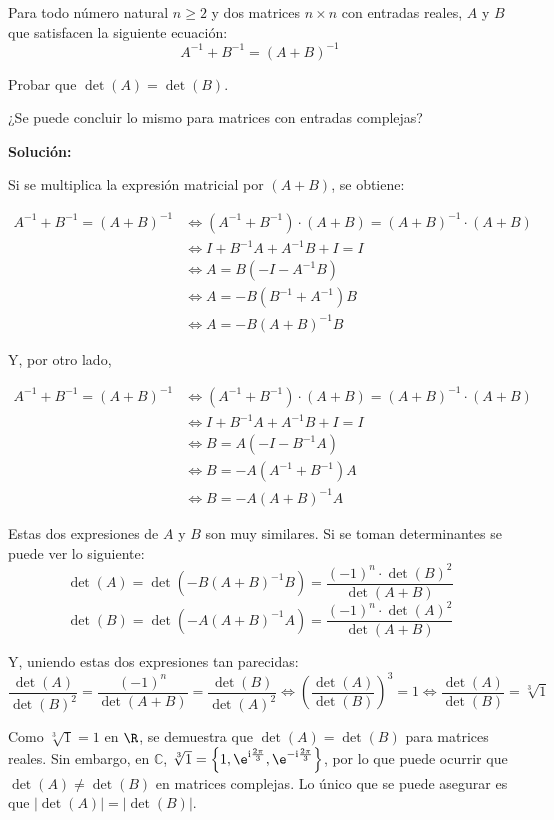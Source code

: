 \documentclass[../../main.tex]{subfiles}
\begin{document}
  \begin{shaded}
    Para todo número natural $n \geq 2$ y dos matrices $n \times n$ con entradas reales, $A$ y $B$ que satisfacen la siguiente ecuación:
    $$
    A^{-1} + B^{-1} = (A + B)^{-1}
    $$

    Probar que $\det{(A)} = \det{(B)}$.

    ¿Se puede concluir lo mismo para matrices con entradas complejas?
  \end{shaded}

  \textbf{Solución:}

  Si se multiplica la expresión matricial por $(A + B)$, se obtiene:

  \begin{equation*}
    \begin{split}
      A^{-1} + B^{-1} = (A + B)^{-1} & \iff
      (A^{-1} + B^{-1}) \cdot (A + B) = (A + B)^{-1} \cdot (A + B) \\ & \iff
      I + B^{-1} A + A^{-1} B + I = I \\ & \iff
      A = B (-I - A^{-1} B) \\ & \iff
      A = -B (B^{-1} + A^{-1}) B \\ & \iff
      A = -B (A + B)^{-1} B
    \end{split}
  \end{equation*}

  Y, por otro lado,

  \begin{equation*}
    \begin{split}
      A^{-1} + B^{-1} = (A + B)^{-1} & \iff
      (A^{-1} + B^{-1}) \cdot (A + B) = (A + B)^{-1} \cdot (A + B) \\ & \iff
      I + B^{-1} A + A^{-1} B + I = I \\ & \iff
      B = A (-I - B^{-1} A) \\ & \iff
      B = -A (A^{-1} + B^{-1}) A \\ & \iff
      B = -A (A + B)^{-1} A
    \end{split}
  \end{equation*}

  Estas dos expresiones de $A$ y $B$ son muy similares. Si se toman determinantes se puede ver lo siguiente:
  $$
  \det{(A)} = \det{\left( -B (A + B)^{-1} B\right)} = \frac{(-1)^n \cdot \det{(B)}^2}{\det{(A + B)}}
  $$
  $$
  \det{(B)} = \det{\left(-A (A + B)^{-1} A\right)} = \frac{(-1)^n \cdot \det{(A)}^2}{\det{(A + B)}}
  $$

  Y, uniendo estas dos expresiones tan parecidas:
  $$
  \frac{\det{(A)}}{\det{(B)}^2} = \frac{(-1)^n}{\det{(A + B)}} = \frac{\det{(B)}}{\det{(A)}^2} \iff \left(\frac{\det{(A)}}{\det{(B)}}\right)^3 = 1 \iff \frac{\det{(A)}}{\det{(B)}} = \sqrt[3]{1}
  $$

  Como $\sqrt[3]{1} = 1$ en $\R$, se demuestra que $\det{(A)} = \det{(B)}$ para matrices reales. Sin embargo, en $\mathbb{C}$, $\sqrt[3]{1} = \left\{ 1, \e^{\text{i}\frac{2\pi}{3}}, \e^{-\text{i}\frac{2\pi}{3}}\right\}$, por lo que puede ocurrir que $\det{(A)} \ne \det{(B)}$ en matrices complejas. Lo único que se puede asegurar es que $|\det{(A)}| = |\det{(B)}|$.
\end{document}
